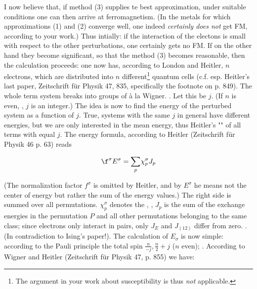 \documentclass{article}
\newcommand{\uequ}[1]{
\begin{align*}
#1
\end{align*}
}
\newcommand{\sumX}[1]{\underset{#1}{\sum}}
\begin{document}
I now believe that, if method (3) supplies te best approximation, under suitable conditions one can then arrive at ferromagnetism. (In the metals for which approximations (1) and (2) converge well, one indeed \textit{certainly does not} get FM, according to your work.) Thus intially: if the interaction of the electons is small with respect to the other perturbations, one certainly gets no FM. If on the other hand they become significant, so that the method (3) becomes reasonable, then the calculation proceeds: one now has, according to London and Heitler, $n$ electrons, which are distributed into $n$ different\footnote{The argument in your work about susceptibility is thus \textit{not} applicable.} quantum cells (c.f. esp. Heitler's last paper, Zeitschrift f\"ur Physik 47, 835, specifically the footnote on p. 849). The whole term system breaks into groups of  \`a la Wigner. . Let this be $j$.  (If $n$ is even, , $j$ is an integer.) The idea is now to find the energy of the perturbed system as a function of $j$. True, systems with the same $j$ in general have different energies, but we are only interested in the mean energy, thus Heitler's "" of all terms with equal $j$. The energy formula, according to Heitler (Zeitschrift f\"ur Physik 46 p. 63) reads
\uequ{
\f^\sigma E^\sigma = \sumX{p}\chi^\sigma_p J_p
}
(The normalization factor $f^\sigma$ is omitted by Heitler, and by $E^\sigma$ he means not the center of energy but rather the sum of the energy values.) The right side is summed over all permutations. $\chi^\sigma_p$ denotes the , , $J_p$ is the sum of the exchange energies in the permutation $P$ and all other permutations belonging to the same class; since electrons only interact in pairs, only $J_E$ and $J_{(12)}$ differ from zero. .  (In contradiction to Ising's paper!). The calculation of $E_\sigma$ is now simple: according to the Pauli principle the total spin  $\frac{n}{-j},\frac{n}{2}+j$ ($n$ even); . According to Wigner and Heitler (Zeitschrift f\"ur Physik 47, p. 855) we have:
\end{document}
